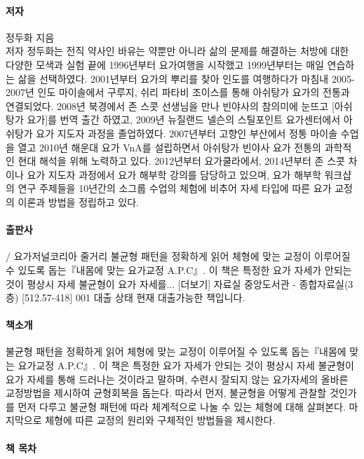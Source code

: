 \documentclass[12pt, a4paper, oneside]{book}
\begin{document}
\paragraph{저자} 정두화 지음 \\
저자 정두화는 전직 약사인 바유는 약뿐만 아니라 삶의 문제를 해결하는 처방에 대한 다양한 모색과 실험 끝에 1996년부터 요가여행을 시작했고 1999년부터는 매일 연습하는 삶을 선택하였다. 2001년부터 요가의 뿌리를 찾아 인도를 여행하다가 마침내 2005-2007년 인도 마이솔에서 구루지, 쉬리 파타비 조이스를 통해 아쉬탕가 요가의 전통과 연결되었다. 2008년 북경에서 존 스콧 선생님을 만나 빈야사의 참의미에 눈뜨고 [아쉬탕가 요가]를 번역 출간 하였고, 2009년 뉴질랜드 넬슨의 스틸포인트 요가센터에서 아쉬탕가 요가 지도자 과정을 졸업하였다. 
2007년부터 고향인 부산에서 정통 마이솔 수업을 열고 2010년 해운대 요가 VnA를 설립하면서 아쉬탕가 빈야사 요가 전통의 과학적인 현대 해석을 위해 노력하고 있다. 2012년부터 요가쿨라에서, 2014년부터 존 스콧 차이나 요가 지도자 과정에서 요가 해부학 강의를 담당하고 있으며, 요가 해부학 워크샵의 연구 주제들을 10년간의 소그룹 수업의 체험에 비추어 자세 타입에 따른 요가 교정의 이론과 방법을 정립하고 있다.

\paragraph{출판사}
/ 요가저널코리아
줄거리	불균형 패턴을 정확하게 읽어 체형에 맞는 교정이 이루어질 수 있도록 돕는『내몸에 맞는 요가교정 A.P.C』. 이 책은 특정한 요가 자세가 안되는 것이 평상시 자세 불균형이 요가 자세를... [더보기]
자료실	중앙도서관 - 종합자료실(3층) [512.57-418]	001
대출 상태	현재 대출가능한 책입니다.


\paragraph{책소개}


불균형 패턴을 정확하게 읽어 체형에 맞는 교정이 이루어질 수 있도록 돕는『내몸에 맞는 요가교정 A.P.C』. 이 책은 특정한 요가 자세가 안되는 것이 평상시 자세 불균형이 요가 자세를 통해 드러나는 것이라고 말하며, 수련시 잘되지 않는 요가자세의 올바른 교정방법을 제시하여 균형회복을 돕는다. 따라서 먼저, 불균형을 어떻게 관찰할 것인가를 먼저 다루고 불균형 패턴에 따라 체계적으로 나눌 수 있는 체형에 대해 살펴본다. 마지막으로 체형에 따른 교정의 원리와 구체적인 방법들을 제시한다.


\paragraph{책 목차}
\end{document}
